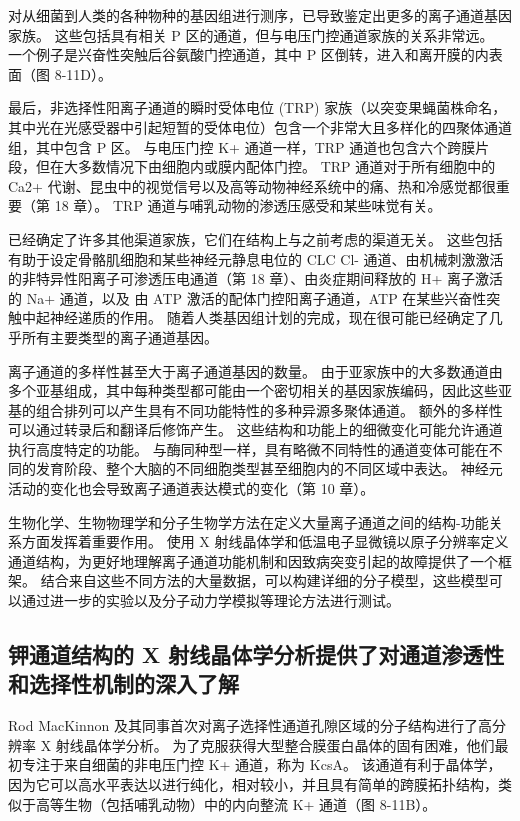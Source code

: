 对从细菌到人类的各种物种的基因组进行测序，已导致鉴定出更多的离子通道基因家族。 这些包括具有相关 P 区的通道，但与电压门控通道家族的关系非常远。 一个例子是兴奋性突触后谷氨酸门控通道，其中 P 区倒转，进入和离开膜的内表面（图 8-11D）。

最后，非选择性阳离子通道的瞬时受体电位 (TRP) 家族（以突变果蝇菌株命名，其中光在光感受器中引起短暂的受体电位）包含一个非常大且多样化的四聚体通道组，其中包含 P 区。 与电压门控 K+ 通道一样，TRP 通道也包含六个跨膜片段，但在大多数情况下由细胞内或膜内配体门控。 TRP 通道对于所有细胞中的 Ca2+ 代谢、昆虫中的视觉信号以及高等动物神经系统中的痛、热和冷感觉都很重要（第 18 章）。 TRP 通道与哺乳动物的渗透压感受和某些味觉有关。

已经确定了许多其他渠道家族，它们在结构上与之前考虑的渠道无关。 这些包括有助于设定骨骼肌细胞和某些神经元静息电位的 CLC Cl- 通道、由机械刺激激活的非特异性阳离子可渗透压电通道（第 18 章）、由炎症期间释放的 H+ 离子激活的 Na+ 通道，以及 由 ATP 激活的配体门控阳离子通道，ATP 在某些兴奋性突触中起神经递质的作用。 随着人类基因组计划的完成，现在很可能已经确定了几乎所有主要类型的离子通道基因。

离子通道的多样性甚至大于离子通道基因的数量。 由于亚家族中的大多数通道由多个亚基组成，其中每种类型都可能由一个密切相关的基因家族编码，因此这些亚基的组合排列可以产生具有不同功能特性的多种异源多聚体通道。 额外的多样性可以通过转录后和翻译后修饰产生。 这些结构和功能上的细微变化可能允许通道执行高度特定的功能。 与酶同种型一样，具有略微不同特性的通道变体可能在不同的发育阶段、整个大脑的不同细胞类型甚至细胞内的不同区域中表达。 神经元活动的变化也会导致离子通道表达模式的变化（第 10 章）。

生物化学、生物物理学和分子生物学方法在定义大量离子通道之间的结构-功能关系方面发挥着重要作用。 使用 X 射线晶体学和低温电子显微镜以原子分辨率定义通道结构，为更好地理解离子通道功能机制和因致病突变引起的故障提供了一个框架。 结合来自这些不同方法的大量数据，可以构建详细的分子模型，这些模型可以通过进一步的实验以及分子动力学模拟等理论方法进行测试。




\subsection{钾通道结构的 X 射线晶体学分析提供了对通道渗透性和选择性机制的深入了解}
Rod MacKinnon 及其同事首次对离子选择性通道孔隙区域的分子结构进行了高分辨率 X 射线晶体学分析。 为了克服获得大型整合膜蛋白晶体的固有困难，他们最初专注于来自细菌的非电压门控 K+ 通道，称为 KcsA。 该通道有利于晶体学，因为它可以高水平表达以进行纯化，相对较小，并且具有简单的跨膜拓扑结构，类似于高等生物（包括哺乳动物）中的内向整流 K+ 通道（图 8-11B）。

